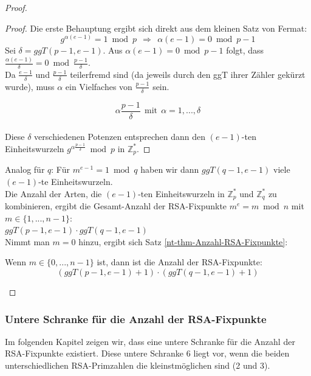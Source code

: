 \begin{refsegment}
\begin{proof}{}
\begin{proof}{}%
Die erste Behauptung ergibt sich direkt aus dem kleinen Satz von Fermat:
\[g^{\alpha (e-1)}= 1 \bmod p  ~~\Rightarrow~~ \alpha (e-1) = 0\bmod p-1 \]
 Sei $\delta =ggT(p-1, e-1)$. Aus $\alpha (e-1) = 0\bmod p-1$ folgt, dass $\frac{\alpha (e-1)}{\delta}= 0 \bmod \frac{p-1}{\delta}$.\\
Da $\frac {e-1}{\delta}$ und $\frac{p-1}{\delta}$ teilerfremd sind (da jeweils durch
den ggT ihrer Zähler gekürzt wurde), muss $\alpha$ ein Vielfaches von $\frac{p-1}{\delta}$ sein.

\[ \alpha \frac{p-1}{\delta} ~~ \text{mit} ~~ \alpha = 1,...,\delta
\]\\
Diese $\delta$ verschiedenen Potenzen entsprechen dann den
$(e-1)$-ten Einheitswurzeln $g^{\alpha \frac{p-1}{\delta}} \bmod p$ in $\mathbb{Z}_p^{*}$.
\end{proof}


 Analog für $q$: Für $m^{e-1} = 1 \bmod q $ haben wir dann $ ggT(q-1, e-1) $
viele $(e-1)$-te Einheitswurzeln.\\

 Die Anzahl der Arten, die $(e-1)$-ten Einheitswurzeln in $\mathbb{Z}_p^{*}$ und
$\mathbb{Z}_q^{*}$ zu kombinieren, ergibt die Gesamt-Anzahl der RSA-Fixpunkte
$ m^e = m \bmod n$ mit $ m \in \{1,...,n-1\}$:\\
 $ggT(p-1, e-1) \cdot ggT(q-1, e-1) $\\


 Nimmt man $m=0$ hinzu, ergibt sich Satz \ref{nt-thm-Anzahl-RSA-Fixpunkte}:
\begin{satz}\label{nt-thm-Anzahl-RSA-Fixpunkte}
Wenn $ m \in \{0,...,n-1\}$ ist, dann ist die Anzahl der RSA-Fixpunkte:
          \[ (ggT(p-1, e-1)+1) \cdot (ggT(q-1, e-1)+1) \]
\end{satz}

\end{proof}



\subsubsection{Untere Schranke für die Anzahl der RSA-Fixpunkte}
Im folgenden Kapitel zeigen wir, dass eine untere Schranke für die Anzahl der RSA-Fixpunkte
existiert. Diese untere Schranke $6$ liegt vor, wenn die beiden unterschiedlichen
RSA-Primzahlen die kleinstmöglichen sind (2 und 3).


\end{refsegment}
